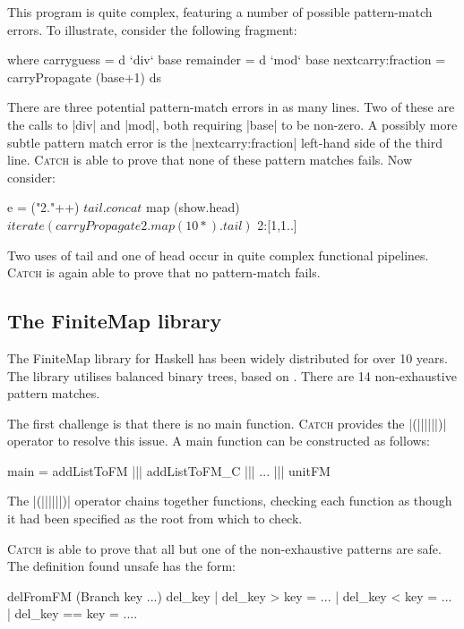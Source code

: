 \documentclass[preprint]{sigplanconf}
\newcommand{\C}[1]{\textsf{#1}}
\newcommand{\catch}{\textsc{Catch}}
\begin{document}
This program is quite complex, featuring a number of possible pattern-match errors. To illustrate, consider the following fragment:

\begin{code}
  where  carryguess = d `div` base
         remainder = d `mod` base
         nextcarry:fraction = carryPropagate (base+1) ds
\end{code}

\noindent There are three potential pattern-match errors in as many lines. Two of these are the calls to |div| and |mod|, both requiring |base| to be non-zero. A possibly more subtle pattern match error is the |nextcarry:fraction| left-hand side of the third line. \catch{} is able to prove that none of these pattern matches fails. Now consider:

\begin{code}
e =  ("2."++) $
     tail . concat $
     map (show.head) $
     iterate (carryPropagate 2 . map (10*) . tail) $
     2:[1,1..]
\end{code}

\noindent Two uses of \C{tail} and one of \C{head} occur in quite complex functional pipelines. \catch{} is again able to prove that no pattern-match fails.

\subsection{The FiniteMap library}
\label{sec:finitemap}

The FiniteMap library for Haskell has been widely distributed for over 10 years. The library utilises balanced binary trees, based on \citep{adams:sets}. There are 14 non-exhaustive pattern matches.

The first challenge is that there is no \C{main} function. \catch{} provides the |(||||||)| operator to resolve this issue. A \C{main} function can be constructed as follows:

\begin{code}
main = addListToFM ||| addListToFM_C ||| ... ||| unitFM
\end{code}

The |(||||||)| operator chains together functions, checking each function as though it had been specified as the root from which to check.

\catch{} is able to prove that all but one of the non-exhaustive patterns are safe. The definition found unsafe has the form:

\begin{code}
delFromFM (Branch key ...) del_key  | del_key  >   key = ...
                                    | del_key  <   key = ...
                                    | del_key  ==  key = ....
\end{code}
\end{document}
